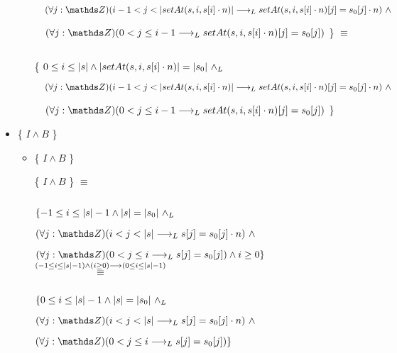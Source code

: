 \documentclass{article}
\begin{document}
\begin{itemize}
\begin{itemize}
            $ \quad (\forall j: \ent)( i-1 < j < \longitud{setAt(s, i, s[i] \cdot n)} \implicaLuego setAt(s, i, s[i] \cdot n)[j] = s_0[j] \cdot n)\ \wedge $
            
            $ \quad (\forall j: \ent)( 0 < j \leq i-1 \implicaLuego setAt(s, i, s[i] \cdot n)[j] = s_0[j]) $ \} $\equiv$

            $ $

            \{ $ 0 \leq i \leq \longitud{s} \wedge \longitud{setAt(s, i, s[i] \cdot n)} = \longitud{s_0}\ \yLuego$
            
            $ \quad (\forall j: \ent)( i-1 < j < \longitud{setAt(s, i, s[i] \cdot n)} \implicaLuego setAt(s, i, s[i] \cdot n)[j] = s_0[j] \cdot n)\ \wedge $
            
            $ \quad (\forall j: \ent)( 0 < j \leq i-1 \implicaLuego setAt(s, i, s[i] \cdot n)[j] = s_0[j]) $ \}

    \end{itemize}

    \item \{ $I \wedge B$ \}

        \begin{itemize}
            \item \{ $I \wedge B$ \}

                \{ $I \wedge B$ \} $\equiv$

                $ $

                $\{ -1 \leq i \leq |s| - 1 \wedge |s| = |s_0|\ \land _L$

\qquad              $(\forall j: \ent)( i < j < \longitud{s} \implicaLuego s[j] = s_0[j] \cdot n)\ \wedge$

\qquad              $(\forall j: \ent)( 0 < j \leq i \implicaLuego s[j] = s_0[j]) \wedge i \geq 0 \} $ $\stackrel{(-1 \leq i \leq |s| - 1) \wedge (i \geq 0) \longrightarrow (0 \leq i \leq |s| - 1)}{\equiv}$

                $ $

                    $\{ 0 \leq i \leq |s| - 1 \wedge |s| = |s_0|\ \land _L$

\qquad              $(\forall j: \ent)( i < j < \longitud{s} \implicaLuego s[j] = s_0[j] \cdot n)\ \wedge$

\qquad              $(\forall j: \ent)( 0 < j \leq i \implicaLuego s[j] = s_0[j])\} $

        \end{itemize}


\end{itemize}
\end{document}
